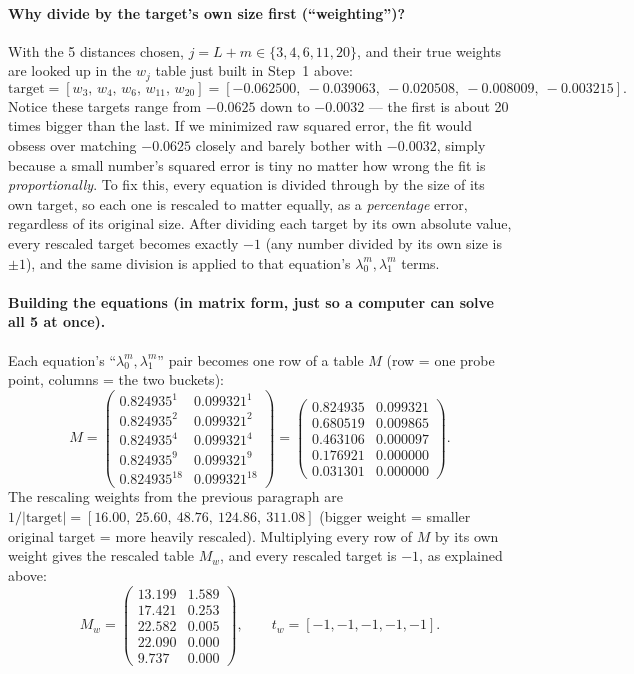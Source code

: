 \documentclass[11pt]{article}
\begin{document}
\paragraph{Why divide by the target's own size first (``weighting'')?}
With the 5 distances chosen, $j=L+m \in \{3,4,6,11,20\}$, and their true weights are looked up in the $w_j$ table just built in Step~1 above:
\[
\text{target} = [w_3,\,w_4,\,w_6,\,w_{11},\,w_{20}] = [-0.062500,\ -0.039063,\ -0.020508,\ -0.008009,\ -0.003215].
\]
Notice these targets range from $-0.0625$ down to $-0.0032$ --- the first is about 20 times bigger than the last. If we minimized raw squared error, the fit would obsess over matching $-0.0625$ closely and barely bother with $-0.0032$, simply because a small number's squared error is tiny no matter how wrong the fit is \emph{proportionally}. To fix this, every equation is divided through by the size of its own target, so each one is rescaled to matter equally, as a \emph{percentage} error, regardless of its original size. After dividing each target by its own absolute value, every rescaled target becomes exactly $-1$ (any number divided by its own size is $\pm1$), and the same division is applied to that equation's $\lambda_0^m,\lambda_1^m$ terms.

\paragraph{Building the equations (in matrix form, just so a computer can solve all 5 at once).}
Each equation's ``$\lambda_0^m,\lambda_1^m$'' pair becomes one row of a table $M$ (row = one probe point, columns = the two buckets):
\[
M = \begin{pmatrix}
0.824935^1 & 0.099321^1 \\
0.824935^2 & 0.099321^2 \\
0.824935^4 & 0.099321^4 \\
0.824935^9 & 0.099321^9 \\
0.824935^{18} & 0.099321^{18}
\end{pmatrix}
=
\begin{pmatrix}
0.824935 & 0.099321 \\
0.680519 & 0.009865 \\
0.463106 & 0.000097 \\
0.176921 & 0.000000 \\
0.031301 & 0.000000
\end{pmatrix}.
\]
The rescaling weights from the previous paragraph are $1/|\text{target}| = [16.00,\ 25.60,\ 48.76,\ 124.86,\ 311.08]$ (bigger weight = smaller original target = more heavily rescaled). Multiplying every row of $M$ by its own weight gives the rescaled table $M_w$, and every rescaled target is $-1$, as explained above:
\[
M_w = \begin{pmatrix}
13.199 & 1.589 \\
17.421 & 0.253 \\
22.582 & 0.005 \\
22.090 & 0.000 \\
9.737 & 0.000
\end{pmatrix}, \qquad t_w = [-1,-1,-1,-1,-1].
\]
\end{document}
